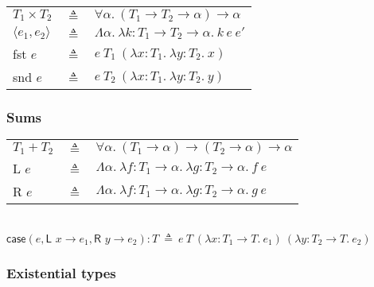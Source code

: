 \documentclass{article}
\begin{document}
\hspace{-1em}
\begin{tabular}{lcl}
$T_1\times T_2$ & \hspace{-0.5em}$\triangleq$ & \hspace{-0.5em}$\forall\alpha.\ (T_1\to T_2\to\alpha)\to\alpha$\\[0.5em]
$\langle e_1,e_2\rangle$ & \hspace{-0.5em}$\triangleq$ & \hspace{-0.5em}$\Lambda\alpha.\ \lambda k:T_1\to T_2\to\alpha.\ k\ e\ e'$\\[0.5em]
\textsf{fst }$e$ & \hspace{-0.5em}$\triangleq$ & \hspace{-0.5em}$e\ T_1\ (\lambda x:T_1.\ \lambda y:T_2.\ x)$\\[0.5em]
\textsf{snd }$e$ & \hspace{-0.5em}$\triangleq$ & \hspace{-0.5em}$e\ T_2\ (\lambda x:T_1.\ \lambda y:T_2.\ y)$
\end{tabular}

\subsubsection*{Sums}

\hspace{-1em}
\begin{tabular}{lcl}
$T_1+T_2$ & \hspace{-0.5em}$\triangleq$ & \hspace{-0.5em}$\forall\alpha.\ (T_1\to\alpha)\to(T_2\to\alpha)\to\alpha$\\[0.5em]
\textsf{L }$e$ & \hspace{-0.5em}$\triangleq$ & \hspace{-0.5em}$\Lambda\alpha.\ \lambda f:T_1\to\alpha.\ \lambda g:T_2\to\alpha.\ f\ e$\\[0.5em]
\textsf{R }$e$ & \hspace{-0.5em}$\triangleq$ & \hspace{-0.5em}$\Lambda\alpha.\ \lambda f:T_1\to\alpha.\ \lambda g:T_2\to\alpha.\ g\ e$\\[0.5em]
\end{tabular}\\
$\textsf{case}(e,\textsf{L }x\to e_1,\textsf{R }y\to e_2):T\ \triangleq\ e\ T\ (\lambda x:T_1\to T.\ e_1)\ (\lambda y:T_2\to T.\ e_2)$

\subsubsection*{Existential types}
\end{document}
